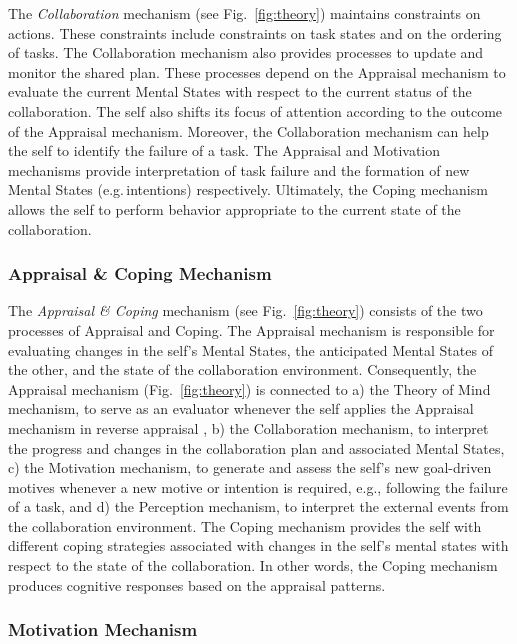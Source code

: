 The \textit{Collaboration} mechanism (see Fig.~\ref{fig:theory}) maintains
constraints on actions. These constraints include constraints on task states and
on the ordering of tasks. The Collaboration mechanism also provides processes to
update and monitor the shared plan. These processes depend on the Appraisal
mechanism to evaluate the current Mental States with respect to the current
status of the collaboration. The self also shifts its focus of attention
according to the outcome of the Appraisal mechanism. Moreover, the Collaboration
mechanism can help the self to identify the failure of a task. The Appraisal and
Motivation mechanisms provide interpretation of task failure and the formation
of new Mental States (e.g.\,intentions) respectively. Ultimately, the Coping
mechanism allows the self to perform behavior appropriate to the current state
of the collaboration.

\subsubsection{Appraisal \& Coping Mechanism}

The \textit{Appraisal \& Coping} mechanism (see Fig.~\ref{fig:theory}) consists
of the two processes of Appraisal and Coping. The Appraisal mechanism is
responsible for evaluating changes in the self's Mental States, the anticipated
Mental States of the other, and the state of the collaboration environment.
Consequently, the Appraisal mechanism (Fig.~\ref{fig:theory}) is connected to a)
the Theory of Mind mechanism, to serve as an evaluator whenever the self applies
the Appraisal mechanism in reverse appraisal \cite{gratch:reverse-appraisal}, b)
the Collaboration mechanism, to interpret the progress and changes in the
collaboration plan and associated Mental States, c) the Motivation mechanism, to
generate and assess the self's new goal-driven motives whenever a new motive or
intention is required, e.g., following the failure of a task, and d) the
Perception mechanism, to interpret the external events from the collaboration
environment. The Coping mechanism provides the self with different coping
strategies associated with changes in the self's mental states with respect to
the state of the collaboration. In other words, the Coping mechanism produces
cognitive responses based on the appraisal patterns.

\subsubsection{Motivation Mechanism}

